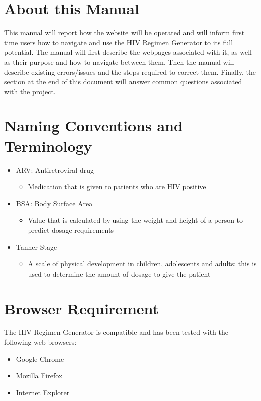\documentclass[12pt]{article}
\begin{document}
\section{About this Manual}
This manual will report how the website will be operated and will inform first time users how to navigate and use the HIV Regimen Generator to its full potential. The manual will first describe the webpages associated with it, as well as their purpose and how to navigate between them. Then the manual will describe existing errors/issues and the steps required to correct them. Finally, the section at the end of this document will answer common questions associated with the project.

\newpage
\section{Naming Conventions and Terminology}
\begin{itemize}
	\item ARV: Antiretroviral drug
	\begin{itemize}
		\item Medication that is given to patients who are HIV positive
	\end{itemize}
	
	\item BSA: Body Surface Area
	\begin{itemize}
		\item Value that is calculated by using the weight and height of a person to predict dosage requirements
	\end{itemize}

	\item Tanner Stage
	\begin{itemize}
		\item A scale of physical development in children, adolescents and adults; this is used to determine the amount of dosage to give the patient
	\end{itemize}
\end{itemize}

\section{Browser Requirement}
The HIV Regimen Generator is compatible and has been tested with the following web browsers:
\begin{itemize}
	\item Google Chrome
	\item Mozilla Firefox
	\item Internet Explorer
\end{itemize}
\end{document}
